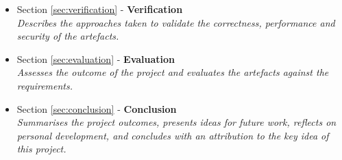 \begin{itemize}
	\item Section \ref{sec:verification} - \textbf{Verification} \\ \textit{Describes the approaches taken to validate the correctness, performance and security of the artefacts.}
\clearpage %
	\item Section \ref{sec:evaluation} - \textbf{Evaluation} \\ \textit{Assesses the outcome of the project and evaluates the artefacts against the requirements.}
	\item Section \ref{sec:conclusion} - \textbf{Conclusion} \\ \textit{Summarises the project outcomes, presents ideas for future work, reflects on personal development, and concludes with an attribution to the key idea of this project.}
\end{itemize}
